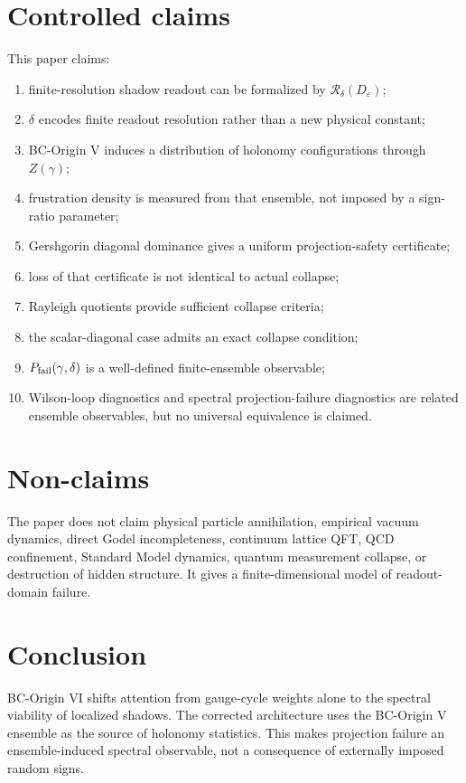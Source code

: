 \documentclass[11pt]{article}
\newcommand{\eps}{\varepsilon}
\newcommand{\Rread}{\mathcal R}
\begin{document}
\section{Controlled claims}
This paper claims:
\begin{enumerate}[leftmargin=1.5em]
\item finite-resolution shadow readout can be formalized by $\Rread_\delta(D_\eps)$;
\item $\delta$ encodes finite readout resolution rather than a new physical constant;
\item BC-Origin V induces a distribution of holonomy configurations through $Z(\gamma)$;
\item frustration density is measured from that ensemble, not imposed by a sign-ratio parameter;
\item Gershgorin diagonal dominance gives a uniform projection-safety certificate;
\item loss of that certificate is not identical to actual collapse;
\item Rayleigh quotients provide sufficient collapse criteria;
\item the scalar-diagonal case admits an exact collapse condition;
\item $P_{\rm fail}(\gamma,\delta)$ is a well-defined finite-ensemble observable;
\item Wilson-loop diagnostics and spectral projection-failure diagnostics are related ensemble observables, but no universal equivalence is claimed.
\end{enumerate}

\section{Non-claims}
The paper does not claim physical particle annihilation, empirical vacuum dynamics, direct Godel incompleteness, continuum lattice QFT, QCD confinement, Standard Model dynamics, quantum measurement collapse, or destruction of hidden structure. It gives a finite-dimensional model of readout-domain failure.

\section{Conclusion}
BC-Origin VI shifts attention from gauge-cycle weights alone to the spectral viability of localized shadows. The corrected architecture uses the BC-Origin V ensemble as the source of holonomy statistics. This makes projection failure an ensemble-induced spectral observable, not a consequence of externally imposed random signs.
\end{document}
